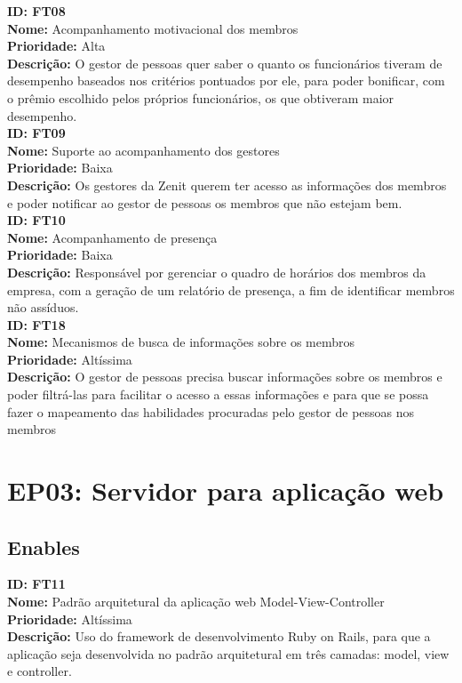 \begin{anexosenv}
\textbf{ID: FT08}\\
\textbf{Nome:} Acompanhamento motivacional dos membros \\
\textbf{Prioridade:} Alta\\
\textbf{Descrição:} O gestor de pessoas quer saber o quanto os funcionários tiveram de desempenho baseados nos critérios pontuados por ele, para poder bonificar, com o prêmio escolhido pelos próprios funcionários, os que obtiveram maior desempenho.\\

\textbf{ID: FT09}\\
\textbf{Nome:} Suporte ao acompanhamento dos gestores \\
\textbf{Prioridade:} Baixa\\
\textbf{Descrição:} Os gestores da Zenit querem ter acesso as informações dos membros e poder notificar ao gestor de pessoas os membros que não estejam bem.\\

\textbf{ID: FT10}\\
\textbf{Nome:} Acompanhamento de presença\\
\textbf{Prioridade:} Baixa\\
\textbf{Descrição:} Responsável por gerenciar o quadro de horários dos membros da empresa, com a geração de um relatório de presença, a fim de identificar membros não assíduos.\\

\textbf{ID: FT18}\\
\textbf{Nome:} Mecanismos de busca de informações sobre os membros\\
\textbf{Prioridade:} Altíssima\\
\textbf{Descrição:} O gestor de pessoas precisa buscar informações sobre os membros e poder filtrá-las para facilitar o acesso a essas informações e para que se possa fazer o mapeamento das habilidades procuradas pelo gestor de pessoas nos membros\\

\section[EP03: Servidor para aplicação web]{EP03: Servidor para aplicação web}

\subsection[Enables]{Enables}

\textbf{ID: FT11}\\
\textbf{Nome: }Padrão arquitetural da aplicação web Model-View-Controller\\
\textbf{Prioridade:} Altíssima\\
\textbf{Descrição:} Uso do framework de desenvolvimento Ruby on Rails, para que a aplicação seja desenvolvida no padrão arquitetural em três camadas: model, view e controller.\\


\end{anexosenv}

